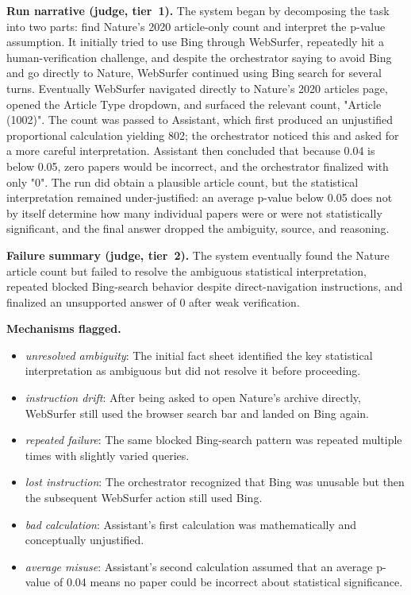 \textbf{Run narrative (judge, tier~1).} The system began by decomposing the task into two parts: find Nature's 2020 article-only count and interpret the p-value assumption. It initially tried to use Bing through WebSurfer, repeatedly hit a human-verification challenge, and despite the orchestrator saying to avoid Bing and go directly to Nature, WebSurfer continued using Bing search for several turns. Eventually WebSurfer navigated directly to Nature's 2020 articles page, opened the Article Type dropdown, and surfaced the relevant count, "Article (1002)". The count was passed to Assistant, which first produced an unjustified proportional calculation yielding 802; the orchestrator noticed this and asked for a more careful interpretation. Assistant then concluded that because 0.04 is below 0.05, zero papers would be incorrect, and the orchestrator finalized with only "0". The run did obtain a plausible article count, but the statistical interpretation remained under-justified: an average p-value below 0.05 does not by itself determine how many individual papers were or were not statistically significant, and the final answer dropped the ambiguity, source, and reasoning.

\textbf{Failure summary (judge, tier~2).} The system eventually found the Nature article count but failed to resolve the ambiguous statistical interpretation, repeated blocked Bing-search behavior despite direct-navigation instructions, and finalized an unsupported answer of 0 after weak verification.

\textbf{Mechanisms flagged.}
\begin{itemize}
  \item \emph{unresolved ambiguity}: The initial fact sheet identified the key statistical interpretation as ambiguous but did not resolve it before proceeding.
  \item \emph{instruction drift}: After being asked to open Nature's archive directly, WebSurfer still used the browser search bar and landed on Bing again.
  \item \emph{repeated failure}: The same blocked Bing-search pattern was repeated multiple times with slightly varied queries.
  \item \emph{lost instruction}: The orchestrator recognized that Bing was unusable but then the subsequent WebSurfer action still used Bing.
  \item \emph{bad calculation}: Assistant's first calculation was mathematically and conceptually unjustified.
  \item \emph{average misuse}: Assistant's second calculation assumed that an average p-value of 0.04 means no paper could be incorrect about statistical significance.
\end{itemize}

